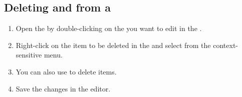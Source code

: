\subsection{Deleting \gdsteps{} and \gdcases{} from a \gdcase{}}
\begin{enumerate}
\item Open the \gdtestcaseeditor{} by double-clicking on the \gdcase{} you want to edit in the \gdtestcasebrowser{}.  
\item Right-click on the item to be deleted in the \gdtestcaseeditor{}
 and select 
 from the context-sensitive menu.  
\item You can also use  to delete items.  
\item Save the changes in the editor.
\end{enumerate}
